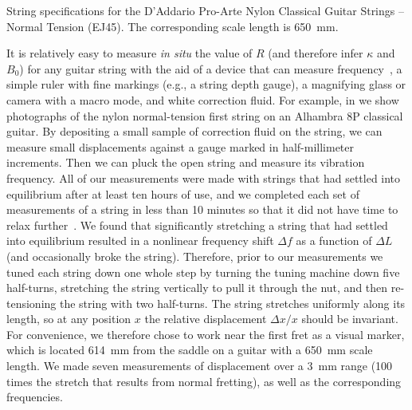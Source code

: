 \begin{table}
  \centering
  \caption{\label{tbl:ej45_mks} String specifications for the D'Addario Pro-Arte Nylon Classical Guitar Strings -- Normal Tension (EJ45). The corresponding scale length is 650~mm.}
  
\end{table}%

It is relatively easy to measure \emph{in situ} the value of $R$ (and therefore infer $\kappa$ and $B_0$) for any guitar string with the aid of a  device that can measure frequency~\cite{ref:pgtweb}, a simple ruler with fine markings (e.g., a string depth gauge), a magnifying glass or camera with a macro mode, and white correction fluid. For example, in  we show photographs of the nylon normal-tension first string on an Alhambra 8P classical guitar. By depositing a small sample of correction fluid on the string, we can measure small displacements against a gauge marked in half-millimeter increments. Then we can pluck the open string and measure its vibration frequency. All of our measurements were made with strings that had settled into equilibrium after at least ten hours of use, and we completed each set of measurements of a string in less than 10 minutes so that it did not have time to relax further~\cite{ref:blanc1996nvb,ref:lynchaird2017mpn}. We found that significantly stretching a string that had settled into equilibrium resulted in a nonlinear frequency shift $\Delta f$ as a function of $\Delta L$ (and occasionally broke the string). Therefore, prior to our measurements we tuned each string down one whole step by turning the tuning machine down five half-turns, stretching the string vertically to pull it through the nut, and then re-tensioning the string with two half-turns. The string stretches uniformly along its length, so at any position $x$ the relative displacement $\Delta x/x$ should be invariant. For convenience, we therefore chose to work near the first fret as a visual marker, which is located 614~mm from the saddle on a guitar with a 650~mm scale length. We made seven measurements of displacement over a 3~mm range (100 times the stretch that results from normal fretting), as well as the corresponding frequencies.

